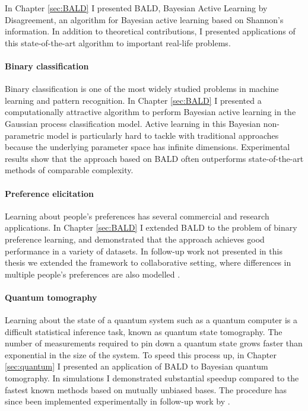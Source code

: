 In Chapter \ref{sec:BALD} I presented BALD, Bayesian Active Learning by Disagreement, an algorithm for Bayesian active learning based on Shannon's information. In addition to theoretical contributions, I presented applications of this state-of-the-art algorithm to important real-life problems.

\paragraph{Binary classification} Binary classification is one of the most widely studied problems in machine learning and pattern recognition. In Chapter \ref{sec:BALD} I presented a computationally attractive algorithm to perform Bayesian active learning in the Gaussian process classification model. Active learning in this Bayesian non-parametric model is particularly hard to tackle with traditional approaches because the underlying parameter space has infinite dimensions. Experimental results show that the approach based on BALD often outperforms state-of-the-art methods of comparable complexity.

\paragraph{Preference elicitation} Learning about people's preferences has several commercial and research applications. In Chapter \ref{sec:BALD} I extended BALD to the problem of binary preference learning, and demonstrated that the approach achieves good performance in a variety of datasets. In follow-up work not presented in this thesis we extended the framework to collaborative setting, where differences in multiple people's preferences are also modelled \citep{Houlsby2012preference}.

\paragraph{Quantum tomography} Learning about the state of a quantum system such as a quantum computer is a difficult statistical inference task, known as quantum state tomography. The number of measurements required to pin down a quantum state grows faster than exponential in the size of the system. To speed this process up, in Chapter \ref{sec:quantum} I presented an application of BALD to Bayesian quantum tomography. In simulations I demonstrated substantial speedup compared to the fastest known methods based on mutually unbiased bases. The procedure has since been implemented experimentally in follow-up work by \citet{Kravtsov2013}.